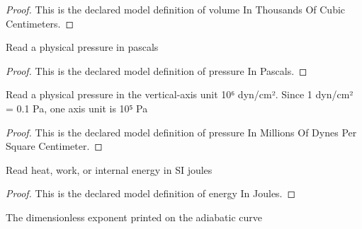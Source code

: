 \begin{proof}
  This is the declared model definition of volume In Thousands Of Cubic Centimeters.
\end{proof}
\begin{definition}
  \label{def:physics:phyx-mini-0356:phyxminiproblems-problemphyxmini0356-pressureinpascals}
  Read a physical pressure in pascals
\end{definition}
\begin{proof}
  This is the declared model definition of pressure In Pascals.
\end{proof}
\begin{definition}
  \label{def:physics:phyx-mini-0356:phyxminiproblems-problemphyxmini0356-pressureinmillionsofdynespersquarecentimeter}
  Read a physical pressure in the vertical-axis unit 10⁶ dyn/cm². Since 1 dyn/cm² = 0.1 Pa, one axis unit is 10⁵ Pa
\end{definition}
\begin{proof}
  This is the declared model definition of pressure In Millions Of Dynes Per Square Centimeter.
\end{proof}
\begin{definition}
  \label{def:physics:phyx-mini-0356:phyxminiproblems-problemphyxmini0356-energyinjoules}
  Read heat, work, or internal energy in SI joules
\end{definition}
\begin{proof}
  This is the declared model definition of energy In Joules.
\end{proof}
\begin{definition}
  \label{def:physics:phyx-mini-0356:phyxminiproblems-problemphyxmini0356-statedadiabaticexponent}
  The dimensionless exponent printed on the adiabatic curve
\end{definition}
